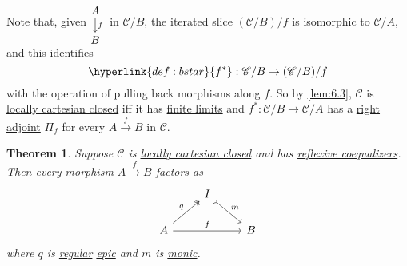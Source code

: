 \documentclass{article}
\newenvironment{tikzcdi}{\begin{tikzcd}[cramped, sep=scriptsize]}{\end{tikzcd}}
\newtheorem{nthm}{Theorem}[section]
\begin{document}
Note that, given $\begin{tikzcdi}A \dar{f} \\ B\end{tikzcdi}$ in $\mathscr{C}/B$, the iterated slice $(\mathscr{C}/B)/f$ is isomorphic to $\mathscr{C}/A$, and this identifies
\begin{equation*}\hyperlink{def:bstar}{f^*}: \mathscr{C}/B \to (\mathscr{C}/B)/f\end{equation*}
with the operation of pulling back morphisms along $f$.
So by \cref{lem:6.3}, $\mathscr{C}$ is \hyperlink{def:lcc}{locally cartesian closed} iff it has \hyperlink{def:limit}{finite limits} and $f^*: \mathscr{C}/B \to \mathscr{C}/A$ has a \hyperlink{def:adj}{right adjoint} $\Pi_f$ for every $A \xrightarrow{f} B$ in $\mathscr{C}$.

\begin{nthm}\label{thm:6.7}
  Suppose $\mathscr{C}$ is \hyperlink{def:lcc}{locally cartesian closed} and has \hyperlink{def:reflexive}{reflexive coequalizers}.
  Then every morphism $A \xrightarrow{f} B$ factors as
  \begin{equation*}
    \begin{tikzcd}
      & I\arrow[rd, tail, "m"] \\
      A \arrow[ur, two heads, "q"] \arrow[rr, "f"] & & B
    \end{tikzcd}
  \end{equation*}
  where $q$ is \hyperlink{def:regular}{regular} \hyperlink{def:epic}{epic} and $m$ is \hyperlink{def:monic}{monic}.
\end{nthm}
\end{document}

